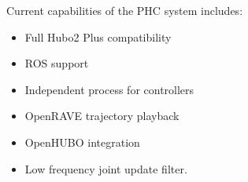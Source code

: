 Current capabilities of the PHC system includes:

\begin{itemize}
\item Full Hubo2 Plus compatibility 
\item ROS support
\item Independent process for controllers
\item OpenRAVE trajectory playback
\item OpenHUBO integration 
\item Low frequency joint update filter.
\end{itemize}




